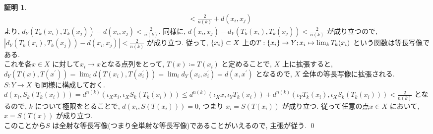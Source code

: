 \documentclass[10pt, fleqn, label-section=none, titlepage]{bxjsarticle}
\theoremstyle{definition}
\newtheorem*{pf*}{証明}
\newcommand{\cbra}[1]{\mleft\{#1\mright\}}
\newcommand{\abs}[1]{\left|#1\right|}
\begin{document}
\begin{pf*}
\begin{align*}
&< \frac{2}{n(k)} + d(x_i, x_j)
\end{align*}
より, $d_Y (T_k(x_i), T_k(x_j) ) - d(x_i, x_j) < \frac{2}{n(k)}$. 同様に, $d(x_i, x_j) - d_Y (T_k(x_i), T_k(x_j) ) < \frac{2}{n(k)}$ が成り立つので, \\
$\abs{d_Y (T_k(x_i), T_k(x_j) ) - d(x_i, x_j) }< \frac{2}{n(k)}$ が成り立つ. 従って, $\cbra{x_i} \subset X$ 上の$T:\cbra{x_i} \rightarrow Y; x_i \mapsto \lim_k T_k(x_i)$ という関数は等長写像である. \\
これを各$x\in X$ に対して$x_i \rightarrow x$となる点列をとって, $T(x) \coloneqq T(x_i) $ と定めることで, $X$ 上に拡張すると, \\
$d_Y (T(x), T(x^\prime)) = \lim_i d(T(x_i), T(x_i^\prime)) = \lim_i d_Y (x_i, x_i^\prime) = d(x, x^\prime)$ となるので, $X$ 全体の等長写像に拡張される. \\
$S:Y\rightarrow X$ も同様に構成しておく. \\
$d(x_i , S_k(T_k(x_i))) = d^{n(k)}(\iota_X x_i , \iota_X S_k(T_k(x_i ))) \leq d^{n(k)} (\iota_X x, \iota_Y T_k(x_i)) + d^{n(k)} (\iota_Y T_k(x_i), \iota_X S_k (T_k(x_i))) < \frac{2}{n(k)}  $ となるので, $k$ について極限をとることで, $d(x_i , S(T(x_i))) = 0$, つまり $x_i = S(T(x_i))$ が成り立つ. 従って任意の点$x \in X$ において, $x = S(T(x))$ が成り立つ. \\
このことから$S$ は全射な等長写像(つまり全単射な等長写像)であることがいえるので, 主張が従う. 
\qed
\end{pf*}
\end{document}
